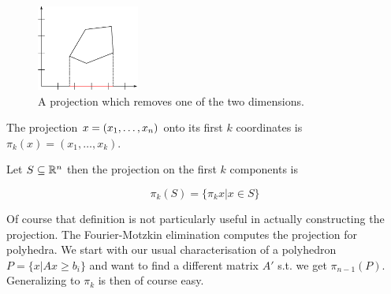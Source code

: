 \begin{figure}[hbt]
\begin{center}
\includegraphics[width=0.3\textwidth]{./images/polyhedron_proj.pdf}
\end{center}
\caption{A projection which removes one of the two dimensions.}
\label{Fig:polyhedron_proj}
\end{figure}

\begin{Def} The projection $x=({x}_1,\ldots,{x}_{n})$ onto its first $k$ coordinates is $\pi_k(x) = (x_1,\ldots, x_k)$. 

Let $S\subseteq \mathbb{R}^n$ then the projection on the first $k$ components is

\[\pi_k(S)=\{\pi_k{x}|x\in S\}\]
\end{Def}

Of course that definition is not particularly useful in actually constructing the projection. The Fourier-Motzkin elimination computes the projection for polyhedra. We start with our usual characterisation of a polyhedron $P=\{x|Ax\geq b_i\}$ and want to find a different matrix $A'$ s.t. we get $\pi_{n-1}(P)$. Generalizing to $\pi_k$ is then of course easy.

